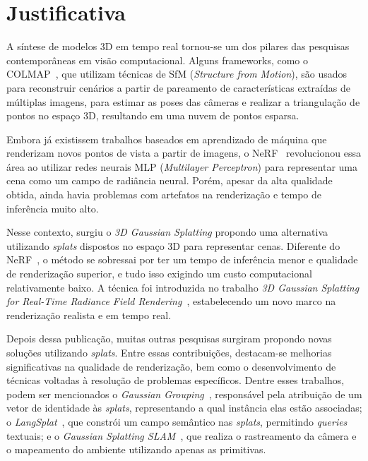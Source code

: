 \section{Justificativa}

A síntese de modelos 3D em tempo real tornou-se um dos pilares das pesquisas contemporâneas em visão computacional. Alguns frameworks, como o COLMAP~\cite{Schonberger_2016_CVPR}, que utilizam técnicas de SfM (\textit{Structure from Motion}), são usados para reconstruir cenários a partir de pareamento de características extraídas de múltiplas imagens, para estimar as poses das câmeras e realizar a triangulação de pontos no espaço 3D, resultando em uma nuvem de pontos esparsa.

Embora já existissem trabalhos baseados em aprendizado de máquina que renderizam novos pontos de vista a partir de imagens, o NeRF~\cite{mildenhall2021nerf} revolucionou essa área ao utilizar redes neurais MLP (\textit{Multilayer Perceptron}) para representar uma cena como um campo de radiância neural. Porém, apesar da alta qualidade obtida, ainda havia problemas com artefatos na renderização e tempo de inferência muito alto.

Nesse contexto, surgiu o \textit{3D Gaussian Splatting} propondo uma alternativa utilizando \emph{splats} dispostos no espaço 3D para representar cenas. Diferente do NeRF~\cite{mildenhall2021nerf}, o método se sobressai por ter um tempo de inferência menor e qualidade de renderização superior, e tudo isso exigindo um custo computacional relativamente baixo. A técnica foi introduzida no trabalho \textit{3D Gaussian Splatting for Real-Time Radiance Field Rendering}~\cite{kerbl20233d}, estabelecendo um novo marco na renderização realista e em tempo real.

Depois dessa publicação, muitas outras pesquisas surgiram propondo novas soluções utilizando \emph{splats}. Entre essas contribuições, destacam-se melhorias significativas na qualidade de renderização, bem como o desenvolvimento de técnicas voltadas à resolução de problemas específicos. Dentre esses trabalhos, podem ser mencionados o \textit{Gaussian Grouping}~\cite{ye2024gaussian}, responsável pela atribuição de um vetor de identidade às \emph{splats}, representando a qual instância elas estão associadas; o \textit{LangSplat}~\cite{Qin_2024_CVPR}, que constrói um campo semântico nas \emph{splats}, permitindo \textit{queries} textuais; e o \textit{Gaussian Splatting SLAM}~\cite{matsuki2024gaussian}, que realiza o rastreamento da câmera e o mapeamento do ambiente utilizando apenas as primitivas.

